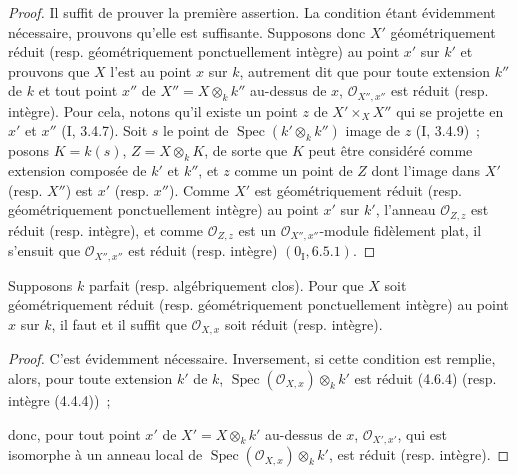 \begin{proof}
Il suffit de prouver la première assertion. La condition étant évidemment
nécessaire, prouvons qu'elle est suffisante. Supposons donc $X'$
géométriquement réduit (resp. géométriquement ponctuellement intègre) au point
$x'$ sur $k'$ et prouvons que $X$ l'est au point $x$ sur $k$, autrement dit que
pour toute extension $k''$ de $k$ et tout point $x''$ de
$X''=X\otimes_k k''$ au-dessus de $x$, $\mathcal O_{X'',x''}$ est réduit (resp.
intègre). Pour cela, notons qu'il existe un point $z$ de $X'\times_X X''$ qui
se projette en $x'$ et $x''$ (I, 3.4.7). Soit $s$ le point de
$\operatorname{Spec}(k'\otimes_k k'')$ image de $z$ (I, 3.4.9)~; posons
$K=k(s)$, $Z=X\otimes_k K$, de sorte que $K$ peut être considéré comme
extension composée de $k'$ et $k''$, et $z$ comme un point de $Z$ dont l'image
dans $X'$ (resp. $X''$) est $x'$ (resp. $x''$). Comme $X'$ est
géométriquement réduit (resp. géométriquement ponctuellement intègre) au point
$x'$ sur $k'$, l'anneau $\mathcal O_{Z,z}$ est réduit (resp. intègre), et comme
$\mathcal O_{Z,z}$ est un $\mathcal O_{X'',x''}$-module fidèlement plat, il
s'ensuit que $\mathcal O_{X'',x''}$ est réduit (resp. intègre)
$(0_{\mathrm I},6.5.1)$.
\end{proof}

\begin{corollary}[4.6.11]
\label{IV.2.4.6.11-fr}
Supposons $k$ parfait (resp. algébriquement clos). Pour que $X$ soit
géométriquement réduit (resp. géométriquement ponctuellement intègre) au point
$x$ sur $k$, il faut et il suffit que $\mathcal O_{X,x}$ soit réduit (resp.
intègre).
\end{corollary}

\begin{proof}
C'est évidemment nécessaire. Inversement, si cette condition est remplie,
alors, pour toute extension $k'$ de $k$,
$\operatorname{Spec}(\mathcal O_{X,x})\otimes_k k'$ est réduit (4.6.4) (resp.
intègre (4.4.4))~;


donc, pour tout point $x'$ de $X'=X\otimes_k k'$ au-dessus de $x$,
$\mathcal O_{X',x'}$, qui est isomorphe à un anneau local de
$\operatorname{Spec}(\mathcal O_{X,x})\otimes_k k'$, est réduit (resp.
intègre).
\end{proof}

